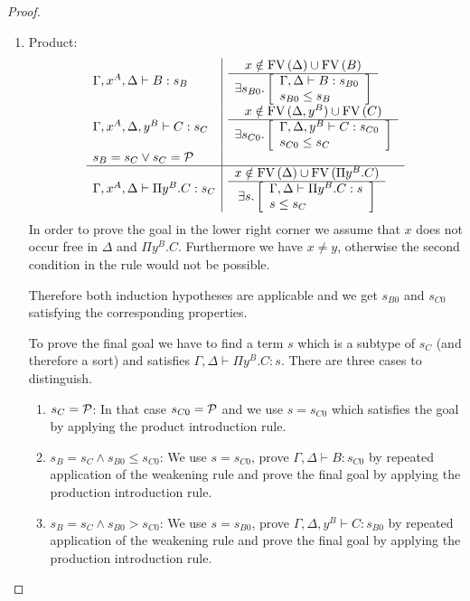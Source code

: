 \begin{lemma}
\begin{proof}
{\begin{enumerate}
\begin{enumerate}
                \item Product:
                $$
                \begin{array}{l|l}
                    \Gamma,x^A,\Delta \vdash B: s_B
                    &
                    \begin{array}{c}  x \notin \text{FV}\, (\Delta) \cup \text{FV}\, (B)  \\ \hline  \exists s_{B0}. \left[ \begin{array}{l} \Gamma,\Delta \vdash B : s_{B0} \\ s_{B0} \le s_B \end{array} \right] \end{array}
                    \\
                    \Gamma,x^A,\Delta,y^B \vdash C: s_C
                    &
                    \begin{array}{c}  x \notin \text{FV}\, (\Delta,y^B) \cup \text{FV}\, (C)  \\ \hline  \exists s_{C0}. \left[ \begin{array}{l} \Gamma,\Delta,y^B \vdash C : s_{C0} \\ s_{C0} \le s_C \end{array} \right] \end{array}
                    \\
                    s_B = s_C \lor s_C = {\cal P}
                    \\
                    \hline
                    \Gamma,x^A,\Delta \vdash \Pi y^B.C : s_C
                    &
                    \begin{array}{c}  x \notin \text{FV}\, (\Delta) \cup \text{FV}\, (\Pi y^B.C)  \\ \hline  \exists s. \left[ \begin{array}{l} \Gamma,\Delta \vdash \Pi y^B.C : s \\ s \le s_C \end{array} \right] \end{array}
                \end{array}
                $$
                In order to prove the goal in the lower right corner we assume
                    that $x$ does not occur free in $\Delta$ and $\Pi y^B.C$.
                    Furthermore we have $x \ne y$, otherwise the second
                    condition in the rule would not be possible.

                Therefore both induction hypotheses are applicable and we get
                    $s_{B0}$ and $s_{C0}$ satisfying the corresponding
                    properties.

                To prove the final goal we have to find a term $s$ which is a
                    subtype of $s_C$ (and therefore a sort) and satisfies
                    $\Gamma,\Delta \vdash \Pi y^B. C: s$. There are three cases
                    to distinguish.
                \begin{enumerate}
                    \item $s_C = {\cal P}$: In that case $s_{C0} = {\cal P}$ and we
                        use $s = s_{C0}$ which satisfies the goal by applying
                        the product introduction rule.

                    \item $s_B = s_C \land s_{B0} \le s_{C0}$: We use $s =
                        s_{C0}$, prove $\Gamma,\Delta \vdash B: s_{C0}$ by
                        repeated application of the weakening rule and prove the
                        final goal by applying the production introduction rule.

                    \item $s_B = s_C \land s_{B0} > s_{C0}$: We use $s =
                        s_{B0}$, prove $\Gamma,\Delta,y^B \vdash C: s_{B0}$ by
                        repeated application of the weakening rule and prove the
                        final goal by applying the production introduction rule.
                \end{enumerate}


\end{enumerate}
\end{enumerate}}
\end{proof}
\end{lemma}
